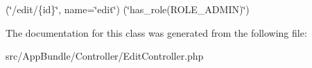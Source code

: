 (\char`\"{}/edit/\{id\}\char`\"{}, name=\char`\"{}edit\char`\"{}) (\char`\"{}has\+\_\+role(\textquotesingle{}\+R\+O\+L\+E\+\_\+\+A\+D\+M\+I\+N\textquotesingle{})\char`\"{}) 

The documentation for this class was generated from the following file\+:\begin{DoxyCompactItemize}
\item 
src/\+App\+Bundle/\+Controller/Edit\+Controller.\+php\end{DoxyCompactItemize}
